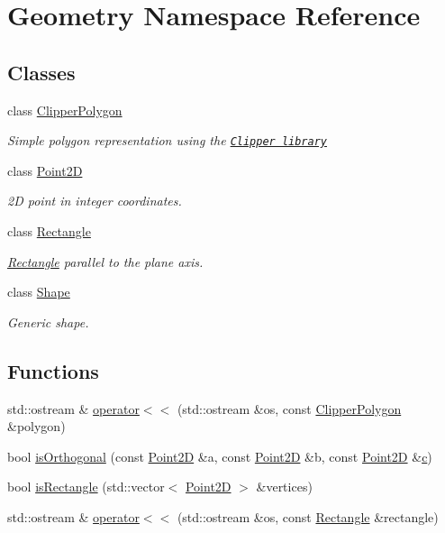 \hypertarget{namespaceGeometry}{}\section{Geometry Namespace Reference}
\label{namespaceGeometry}
\subsection*{Classes}
\begin{DoxyCompactItemize}
\item 
class \hyperlink{classGeometry_1_1ClipperPolygon}{Clipper\+Polygon}
\begin{DoxyCompactList}\small\item\em Simple polygon representation using the \href{http://www.angusj.com/delphi/clipper.php}{\tt Clipper library} \end{DoxyCompactList}\item 
class \hyperlink{classGeometry_1_1Point2D}{Point2D}
\begin{DoxyCompactList}\small\item\em 2D point in integer coordinates. \end{DoxyCompactList}\item 
class \hyperlink{classGeometry_1_1Rectangle}{Rectangle}
\begin{DoxyCompactList}\small\item\em \hyperlink{classGeometry_1_1Rectangle}{Rectangle} parallel to the plane axis. \end{DoxyCompactList}\item 
class \hyperlink{classGeometry_1_1Shape}{Shape}
\begin{DoxyCompactList}\small\item\em Generic shape. \end{DoxyCompactList}\end{DoxyCompactItemize}
\subsection*{Functions}
\begin{DoxyCompactItemize}
\item 
std\+::ostream \& \hyperlink{namespaceGeometry_a22a5a71e9b20685458a895f1ce751fab}{operator$<$$<$} (std\+::ostream \&os, const \hyperlink{classGeometry_1_1ClipperPolygon}{Clipper\+Polygon} \&polygon)
\item 
bool \hyperlink{namespaceGeometry_a8694892694aaa62c463ea4fb268f0e5e}{is\+Orthogonal} (const \hyperlink{classGeometry_1_1Point2D}{Point2D} \&a, const \hyperlink{classGeometry_1_1Point2D}{Point2D} \&b, const \hyperlink{classGeometry_1_1Point2D}{Point2D} \&\hyperlink{CMakeCache_8txt_aac1d6a1710812201527c735f7c6afbaa}{c})
\item 
bool \hyperlink{namespaceGeometry_ad19234394b8890f16dd489a33c6d62ca}{is\+Rectangle} (std\+::vector$<$ \hyperlink{classGeometry_1_1Point2D}{Point2D} $>$ \&vertices)
\item 
std\+::ostream \& \hyperlink{namespaceGeometry_a41187ad6b2f42115fea347fc93f7992f}{operator$<$$<$} (std\+::ostream \&os, const \hyperlink{classGeometry_1_1Rectangle}{Rectangle} \&rectangle)
\end{DoxyCompactItemize}


